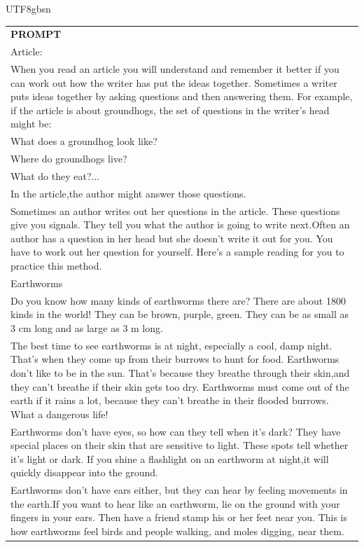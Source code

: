 \documentclass[11pt, a4paper, logo, copyright, nonumbering]{deepseek}
\begin{document}
\begin{CJK*}{UTF8}{gbsn}
\begin{table}[h]
    \centering \small
\begin{tabular}{p{14cm}}
\toprule
\textbf{PROMPT}\\
Article:\\
When you read an article you will understand and remember it better if you can work out how the writer has put the ideas together. Sometimes a writer puts ideas together by asking questions and then answering them. For example, if the article is about groundhogs, the set of questions in the writer's head might be:\\
What does a groundhog look like?\\
Where do groundhogs live?\\
What do they eat?...\\
In the article,the author might answer those questions.\\
Sometimes an author writes out her questions in the article. These questions give you signals. They tell you what the author is going to write next.Often an author has a question in her head but she doesn't write it out for you. You have to work out her question for yourself. Here's a sample reading for you to practice this method.\\
Earthworms\\
Do you know how many kinds of earthworms there are? There are about 1800 kinds in the world! They can be brown, purple, green. They can be as small as 3 cm long and as large as 3 m long.\\
The best time to see earthworms is at night, especially a cool, damp night. That's when they come up from their burrows to hunt for food. Earthworms don't like to be in the sun. That's because they breathe through their skin,and they can't breathe if their skin gets too dry. Earthworms must come out of the earth if it rains a lot, because they can't breathe in their flooded burrows. What a dangerous life!\\
Earthworms don't have eyes, so how can they tell when it's dark? They have special places on their skin that are sensitive to light. These spots tell whether it's light or dark. If you shine a flashlight on an earthworm at night,it will quickly disappear into the ground.\\
Earthworms don't have ears either, but they can hear by feeling movements in the earth.If you want to hear like an earthworm, lie on the ground with your fingers in your ears. Then have a friend stamp his or her feet near you. This is how earthworms feel birds and people walking, and moles digging, near them.\\

\end{tabular}
\end{table}
\end{CJK*}
\end{document}
